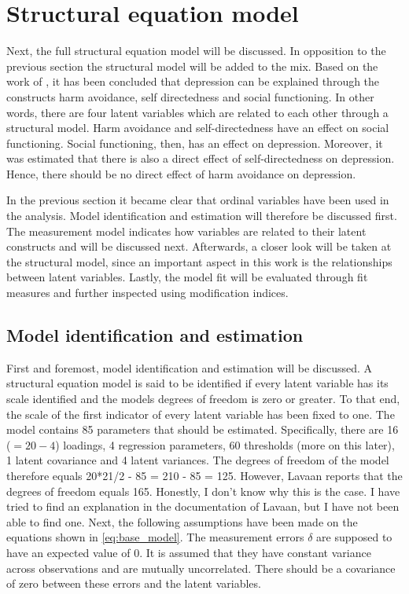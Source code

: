 \documentclass[11pt]{article}
\begin{document}
\FloatBarrier\pagebreak\section{Structural equation model}

Next, the full structural equation model will be discussed. In opposition to the
previous section the structural model will be added to the mix. Based on the
work of \textcite{tse2011}, it has been concluded that depression can be
explained through the constructs harm avoidance, self directedness and social
functioning. In other words, there are four latent variables which are related
to each other through a structural model. Harm avoidance and self-directedness
have an effect on social functioning. Social functioning, then, has an effect on
depression. Moreover, it was estimated that there is also a direct effect of
self-directedness on depression. Hence, there should be no direct effect of harm
avoidance on depression.

In the previous section it became clear that ordinal variables have been used in
the analysis. Model identification and estimation will therefore be discussed
first. The measurement model indicates how variables are related to their latent
constructs and will be discussed next. Afterwards, a closer look will be taken
at the structural model, since an important aspect in this work is the
relationships between latent variables. Lastly, the model fit will be evaluated
through fit measures and further inspected using modification indices.

\subsection{Model identification and estimation}

First and foremost, model identification and estimation will be discussed.
A structural equation model is said to be identified if every latent variable
has its scale identified and the models degrees of freedom is zero or greater.
To that end, the scale of the first indicator of every latent variable has been
fixed to one. The model contains 85 parameters that should be estimated.
Specifically, there are 16 ($=20 - 4$) loadings, 4 regression parameters, 60
thresholds (more on this later), 1 latent covariance and 4 latent variances.
The degrees of freedom of the model therefore equals 20*21/2 - 85 = 210 - 85
= 125. However, Lavaan reports that the degrees of freedom equals 165. Honestly,
I don't know why this is the case. I have tried to find an explanation in the
documentation of Lavaan, but I have not been able to find one.
Next, the following assumptions have been made on the equations shown
in \ref{eq:base_model}. The measurement errors $\delta$ are supposed to have an
expected value of 0. It is assumed that they have constant variance across
observations and are mutually uncorrelated. There should be a covariance of zero
between these errors and the latent variables.
\end{document}
